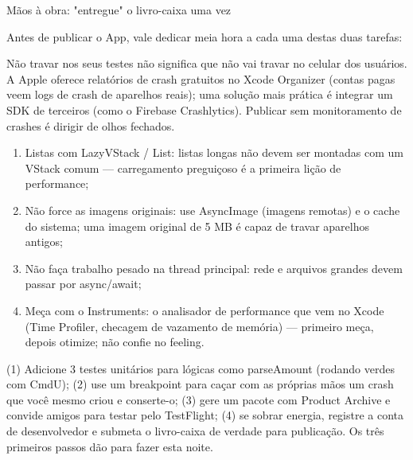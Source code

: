 \begin{tcbpractice}{Mãos à obra: "entregue" o livro-caixa uma vez}

Antes de publicar o App, vale dedicar meia hora a cada uma destas duas tarefas:


Não travar nos seus testes não significa que não vai travar no celular dos usuários. A Apple oferece relatórios de crash gratuitos no Xcode Organizer (contas pagas veem logs de crash de aparelhos reais); uma solução mais prática é integrar um SDK de terceiros (como o Firebase Crashlytics). Publicar sem monitoramento de crashes é dirigir de olhos fechados.


\begin{enumerate}
  \item Listas com LazyVStack / List: listas longas não devem ser montadas com um VStack comum — carregamento preguiçoso é a primeira lição de performance;
  \item Não force as imagens originais: use AsyncImage (imagens remotas) e o cache do sistema; uma imagem original de 5 MB é capaz de travar aparelhos antigos;
  \item Não faça trabalho pesado na thread principal: rede e arquivos grandes devem passar por async/await;
  \item Meça com o Instruments: o analisador de performance que vem no Xcode (Time Profiler, checagem de vazamento de memória) — primeiro meça, depois otimize; não confie no feeling.
\end{enumerate}

(1) Adicione 3 testes unitários para lógicas como parseAmount (rodando verdes com CmdU); (2) use um breakpoint para caçar com as próprias mãos um crash que você mesmo criou e conserte-o; (3) gere um pacote com Product Archive e convide amigos para testar pelo TestFlight; (4) se sobrar energia, registre a conta de desenvolvedor e submeta o livro-caixa de verdade para publicação. Os três primeiros passos dão para fazer esta noite.

\end{tcbpractice}


